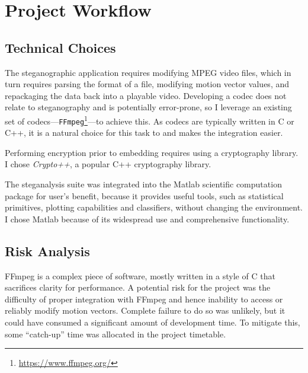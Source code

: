 \documentclass[12pt,british,twoside,notitlepage,usenames,dvipsnames,hypens,final]{report}
\numberwithin{equation}{section}
\numberwithin{figure}{section}
\begin{document}
\section{Project Workflow}

\subsection{Technical Choices}
\label{tech-choices}

The steganographic application requires modifying MPEG video files, which in turn requires parsing the format of a file, modifying motion vector values, and repackaging the data back into a playable video. Developing a codec does not relate to steganography and is potentially error-prone, so I leverage an existing set of codecs---\texttt{FFmpeg}\footnote{\url{https://www.ffmpeg.org/}}---to achieve this. As codecs are typically written in C or C++, it is a natural choice for this task to and makes the integration easier.

Performing encryption prior to embedding requires using a cryptography library. I chose \emph{Crypto++}, a popular C++ cryptography library.

The steganalysis suite was integrated into the Matlab scientific computation package for user's benefit, because it provides useful tools, such as statistical primitives, plotting capabilities and classifiers, without changing the environment. I chose Matlab  because of its widespread use and comprehensive functionality.

\subsection{Risk Analysis}
FFmpeg is a complex piece of software, mostly written in a style of C that sacrifices clarity for performance. A potential risk for the project was the difficulty of proper integration with FFmpeg and hence inability to access or reliably modify motion vectors. Complete failure to do so was unlikely, but it could have consumed a significant amount of development time. To mitigate this, some ``catch-up'' time was allocated in the project timetable.  
\end{document}
